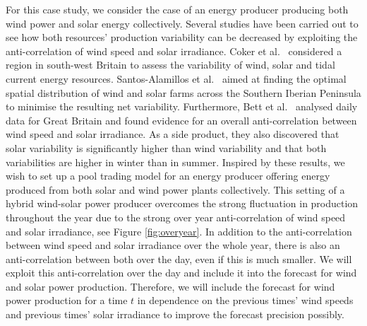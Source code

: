 For this case study, we consider the case of an energy producer producing both wind power and solar energy collectively. Several studies have been carried out to see how both resources' production variability  can be decreased by exploiting the anti-correlation of wind speed and solar irradiance. Coker et al.\ \cite{Coker2013} considered a region in south-west Britain to assess the variability of wind, solar and tidal current energy resources. Santos-Alamillos et al.\ \cite{Santos-Alamillos} aimed at finding the optimal spatial distribution of wind and solar farms across the Southern Iberian Peninsula to minimise the resulting net variability. Furthermore, Bett et al.\ \cite{BETT16} analysed daily data for Great Britain and found  evidence for an overall anti-correlation between wind speed and solar irradiance. As a side product, they also discovered that solar variability is significantly higher than wind variability and that both variabilities are higher in winter than in summer. Inspired by these results, we wish to set up a pool trading model for an energy producer offering energy produced from both solar and wind power plants collectively.  
This setting of a hybrid wind-solar power producer
	overcomes the strong fluctuation in production throughout the year due to the strong over year anti-correlation of wind speed and solar irradiance, see Figure \ref{fig:overyear}. In addition to
	the anti-correlation between wind speed and solar irradiance over the whole year, there is also an anti-correlation between both over the day, even if this is much smaller. We will exploit this anti-correlation over the day and include it into the forecast
	for wind and solar power production. Therefore, we will include the forecast for wind power production for a time $t$ in dependence on the previous times' wind speeds and previous times' solar irradiance to improve the forecast precision possibly.


